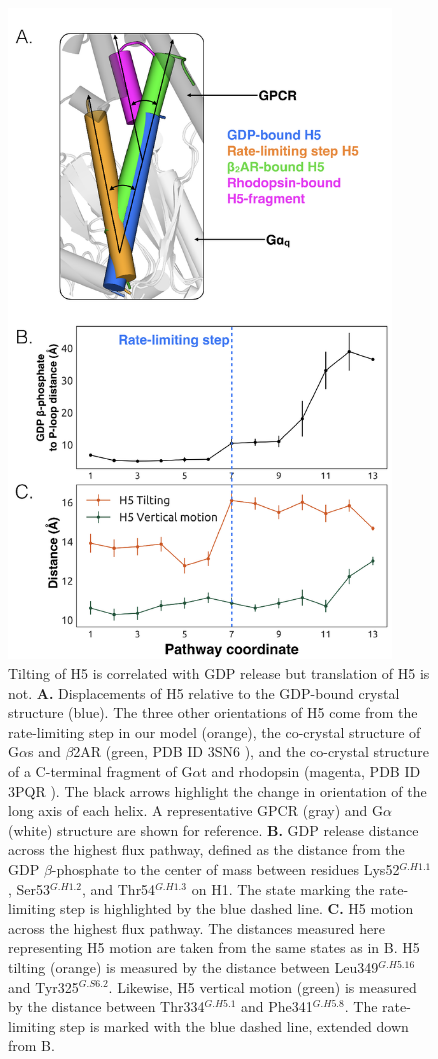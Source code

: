 \documentclass[../main.tex]{subfiles}
\begin{document}
        \begin{figure}[H] %
            \centering
            \includegraphics[width=4in]{ch4-fig3.png}
            \caption[Tilting of H5 is correlated with GDP release but translation of H5 is not.]
                {Tilting of H5 is correlated with GDP release but translation of H5 is not. \textbf{A.} Displacements of H5 relative to the GDP-bound crystal structure (blue). The three other orientations of H5 come from the rate-limiting step in our model (orange), the co-crystal structure of G$\alpha$s and $\beta$2AR (green, PDB ID 3SN6 \cite{Rasmussen:2011kp}), and the co-crystal structure of a C-terminal fragment of G$\alpha$t and rhodopsin (magenta, PDB ID 3PQR \cite{Choe:2011cb}). The black arrows highlight the change in orientation of the long axis of each helix. A representative GPCR (gray) and G$\alpha$ (white) structure are shown for reference. \textbf{B.} GDP release distance across the highest flux pathway, defined as the distance from the GDP $\beta$-phosphate to the center of mass between residues Lys52$^{G.H1.1}$, Ser53$^{G.H1.2}$, and Thr54$^{G.H1.3}$ on H1. The state marking the rate-limiting step is highlighted by the blue dashed line. \textbf{C.} H5 motion across the highest flux pathway. The distances measured here representing H5 motion are taken from the same states as in B. H5 tilting (orange) is measured by the distance between Leu349$^{G.H5.16}$ and Tyr325$^{G.S6.2}$. Likewise, H5 vertical motion (green) is measured by the distance between Thr334$^{G.H5.1}$ and Phe341$^{G.H5.8}$. The rate-limiting step is marked with the blue dashed line, extended down from B.}
            \label{fig:ch4-fig3}
        \end{figure}
\end{document}
